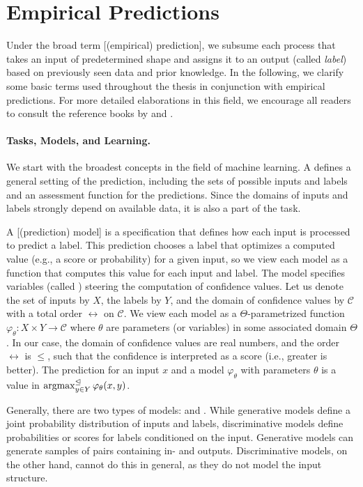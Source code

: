 \documentclass[../document.tex]{subfiles}
\begin{document}
    \section{Empirical Predictions}\label{sec:predictions}
    Under the broad term [(empirical) prediction], we subsume each process that takes an input of predetermined shape and assigns it to an output (called \emph{label}) based on previously seen data and prior knowledge.
    In the following, we clarify some basic terms used throughout the thesis in conjunction with empirical predictions.
    For more detailed elaborations in this field, we encourage all readers to consult the reference books by \citet{Moh12} and \citet{Dau17}.

    \paragraph{Tasks, Models, and Learning.}
    We start with the broadest concepts in the field of machine learning.
    A  defines a general setting of the prediction, including the sets of possible inputs and labels and an assessment function for the predictions.
    Since the domains of inputs and labels strongly depend on available data, it is also a part of the task.

    A [(prediction) model] is a specification that defines how each input is processed to predict a label.
    This prediction chooses a label that optimizes a computed  value (e.g., a score or probability) for a given input, so we view each model as a function that computes this value for each input and label.
    The model specifies variables (called ) steering the computation of confidence values.
    Let us denote the set of inputs by \(X\), the labels by \(Y\), and the domain of confidence values by \(\mathcal{C}\) with a total order \(\rel\) on \(\mathcal{C}\).
    We view each model as a \(\varTheta\)-parametrized function \(\varphi_\theta\colon X \times Y \to \mathcal{C}\) where \(\theta\) are parameters (or variables) in some associated domain \(\varTheta\).
    In our case, the domain of confidence values are real numbers, and the order \(\rel\) is \(\leq\), such that the confidence is interpreted as a score (i.e., greater is better).
    The prediction for an input \(x\) and a model \(\varphi_\theta\) with parameters \(\theta\) is a value in \(\operatorname{arg max}^{\mathrel{\unlhd}}_{y \in Y} \varphi_\theta(x, y)\).

    Generally, there are two types of models:  and .
    While generative models define a joint probability distribution of inputs and labels, discriminative models define probabilities or scores for labels conditioned on the input.
    Generative models can generate samples of pairs containing in- and outputs.
    Discriminative models, on the other hand, cannot do this in general, as they do not model the input structure.
\end{document}
